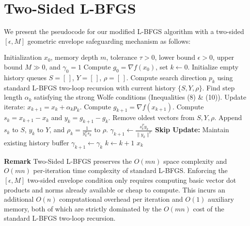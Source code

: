 \documentclass[twoside,11pt]{article}
\begin{document}
\section{Two-Sided L-BFGS}

We present the pseudocode for our modified L-BFGS algorithm with a two-sided $[\epsilon, M]$ geometric envelope safeguarding mechanism as follows:

\begin{algorithm}[H]
\caption{Two-Sided L-BFGS}
\begin{algorithmic}
\Require Initialization $x_0$, memory depth $m$, tolerance $\tau > 0$, lower bound $\epsilon > 0$, upper bound $M \gg 0$, and $\gamma_0 = 1$
\State Compute $g_0 = \nabla f(x_0)$, set $k \gets 0$.
\State Initialize empty history queues $S = [\,]$, $Y = [\,]$, $\rho = [\,]$.
    \State Compute search direction $p_k$ using standard L-BFGS two-loop recursion with current history $\{S, Y, \rho\}$.
    \State Find step length $\alpha_k$ satisfying the strong Wolfe conditions (Inequalities (8) \& (10)).
    \State Update iterate: $x_{k+1} = x_k + \alpha_k p_k$.
    \State Compute $g_{k+1} = \nabla f(x_{k+1})$.
    \State Compute $s_k = x_{k+1} - x_k$ and $y_k = g_{k+1} - g_k$.
     
        \State Remove oldest vectors from $S, Y, \rho$.
    \EndIf
    \State Append $s_k$ to $S$, $y_k$ to $Y$, and $\rho_k = \frac{1}{y_k^T s_k}$ to $\rho$.
    \State $\gamma_{k+1} \gets \frac{s_k^T y_k}{\|y_k\|^2}$ 
\Else
    \State \textbf{Skip Update:} Maintain existing history buffer
    \State $\gamma_{k+1} \gets \gamma_k$ 
\EndIf
    \State $k \gets k + 1$
\EndWhile
\State \Return $x_k$
\end{algorithmic}
\end{algorithm}

\noindent
\textbf{Remark} Two-Sided L-BFGS preserves the $O(mn)$ space complexity and $O(mn)$ per-iteration time complexity of standard L-BFGS. Enforcing the $[\epsilon, M]$ two-sided envelope condition only requires computing basic vector dot products and norms already available or cheap to compute. This incurs an additional $O(n)$ computational overhead per iteration and $O(1)$ auxiliary memory, both of which are strictly dominated by the $O(mn)$ cost of the standard L-BFGS two-loop recursion.
\end{document}
